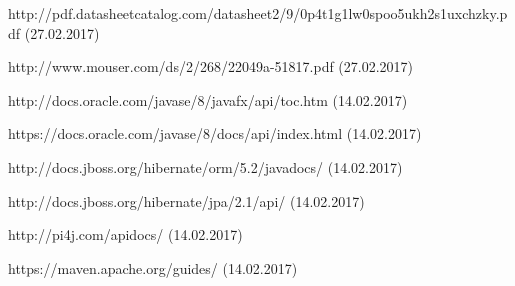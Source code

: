 \documentclass[12pt]{article} %
\numberwithin{equation}{subsection}
\numberwithin{figure}{section}
\numberwithin{table}{section}
\begin{document}
\begin{thebibliography}{99}
		http://pdf.datasheetcatalog.com/datasheet2/9/0p4t1g1lw0spoo5ukh2s1uxchzky.pdf (27.02.2017)
		
		http://www.mouser.com/ds/2/268/22049a-51817.pdf (27.02.2017)
		
		http://docs.oracle.com/javase/8/javafx/api/toc.htm (14.02.2017)
		
		https://docs.oracle.com/javase/8/docs/api/index.html (14.02.2017)
		
		http://docs.jboss.org/hibernate/orm/5.2/javadocs/ (14.02.2017)
		
		http://docs.jboss.org/hibernate/jpa/2.1/api/ (14.02.2017)
		
		http://pi4j.com/apidocs/ (14.02.2017)
		
		https://maven.apache.org/guides/ (14.02.2017)
		

\end{thebibliography}
	\newpage

	\listoffigures{}
	\newpage

	\listoftables
	\newpage
\end{document}
